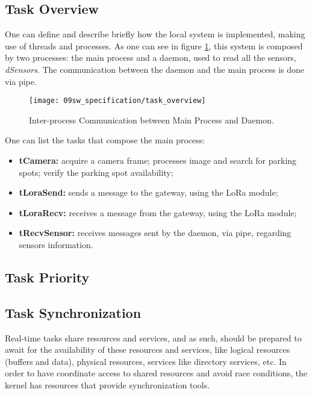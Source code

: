 \subsection{Task Overview}
One can define and describe briefly how the local system is implemented, making use of threads and processes. As one can see in figure \ref{fig:task_overview}, this system is composed by two processes: the main process and a daemon, used to read all the sensors, \textit{dSensors}. The communication between the daemon and the main process is done via pipe.

\begin{figure}[H]
	\centering
	\texttt{[image: 09sw\_specification/task\_overview]}
	\caption{Inter-process Communication between Main Process and Daemon.}
	\label{fig:task_overview}
\end{figure}

One can list the tasks that compose the main process:
\begin{itemize}
	\item \textbf{tCamera:} acquire a camera frame; processes image and search for parking spots; verify the parking spot availability;
	\item \textbf{tLoraSend:} sends a message to the gateway, using the LoRa module;
	\item \textbf{tLoraRecv:} receives a message from the gateway, using the LoRa module;
	\item \textbf{tRecvSensor:} receives messages sent by the daemon, via pipe, regarding sensors information.
\end{itemize}

\subsection{Task Priority}

\subsection{Task Synchronization}
Real-time tasks share resources and services, and as such, should be prepared to await for the availability of these resources and services, like logical resources (buffers and data), physical resources, services like directory services, etc. In order to have coordinate access to shared resources and avoid race conditions, the kernel has resources that provide synchronization tools. 

